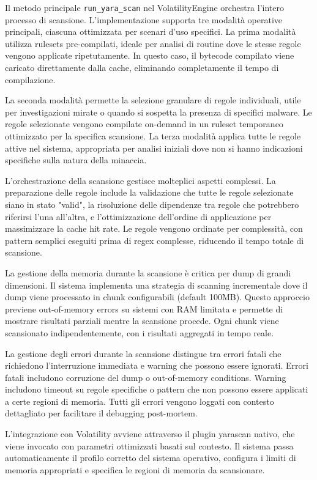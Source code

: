Il metodo principale \texttt{run\_yara\_scan} nel VolatilityEngine orchestra l'intero processo di scansione. L'implementazione supporta tre modalità operative principali, ciascuna ottimizzata per scenari d'uso specifici. La prima modalità utilizza rulesets pre-compilati, ideale per analisi di routine dove le stesse regole vengono applicate ripetutamente. In questo caso, il bytecode compilato viene caricato direttamente dalla cache, eliminando completamente il tempo di compilazione.

La seconda modalità permette la selezione granulare di regole individuali, utile per investigazioni mirate o quando si sospetta la presenza di specifici malware. Le regole selezionate vengono compilate on-demand in un ruleset temporaneo ottimizzato per la specifica scansione. La terza modalità applica tutte le regole attive nel sistema, appropriata per analisi iniziali dove non si hanno indicazioni specifiche sulla natura della minaccia.

L'orchestrazione della scansione gestisce molteplici aspetti complessi. La preparazione delle regole include la validazione che tutte le regole selezionate siano in stato "valid", la risoluzione delle dipendenze tra regole che potrebbero riferirsi l'una all'altra, e l'ottimizzazione dell'ordine di applicazione per massimizzare la cache hit rate. Le regole vengono ordinate per complessità, con pattern semplici eseguiti prima di regex complesse, riducendo il tempo totale di scansione.

La gestione della memoria durante la scansione è critica per dump di grandi dimensioni. Il sistema implementa una strategia di scanning incrementale dove il dump viene processato in chunk configurabili (default 100MB). Questo approccio previene out-of-memory errors su sistemi con RAM limitata e permette di mostrare risultati parziali mentre la scansione procede. Ogni chunk viene scansionato indipendentemente, con i risultati aggregati in tempo reale.

La gestione degli errori durante la scansione distingue tra errori fatali che richiedono l'interruzione immediata e warning che possono essere ignorati. Errori fatali includono corruzione del dump o out-of-memory conditions. Warning includono timeout su regole specifiche o pattern che non possono essere applicati a certe regioni di memoria. Tutti gli errori vengono loggati con contesto dettagliato per facilitare il debugging post-mortem.

L'integrazione con Volatility avviene attraverso il plugin yarascan nativo, che viene invocato con parametri ottimizzati basati sul contesto. Il sistema passa automaticamente il profilo corretto del sistema operativo, configura i limiti di memoria appropriati e specifica le regioni di memoria da scansionare.

